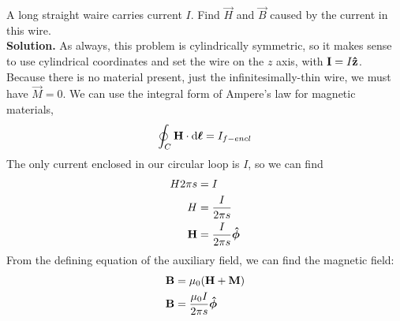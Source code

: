 \documentclass[a4paper]{article}
\begin{document}
\begin{eg}
	A long straight waire carries current $I$. Find $\vec{H}$ and
	$\vec{B}$ caused by the current in this wire.\\
	\textbf{Solution.}
	As always, this problem is cylindrically symmetric, so it makes sense
	to use cylindrical coordinates and set the wire on the $z$ axis, with
	$\boldsymbol{\mathbf{I}} = I\boldsymbol{\mathbf{\hat{z}}}$. Because there is no material present, just the
	infinitesimally-thin wire, we must have $\vec{M} = 0$.
	We can use the integral form of Ampere's law for
	magnetic materials,
	\[ \oint_C \boldsymbol{\mathbf{H}}\cdot\mathrm{d}\boldsymbol{\mathbf{\ell}} = I_{f-encl} \]
	The only current enclosed in our circular loop is $I$, so we can
	find
	\begin{align*}
		H2\pi s &= I\\
		H &= \frac{I}{2\pi s}\\
		\boldsymbol{\mathbf{H}} &= \frac{I}{2\pi s}\boldsymbol{\mathbf{\hat{\phi}}}
	\end{align*}
	From the defining equation of the auxiliary field, we can find the
	magnetic field:
	\begin{align*}
		\boldsymbol{\mathbf{B}} &= \mu_0(\boldsymbol{\mathbf{H}}+\boldsymbol{\mathbf{M}})\\
		\boldsymbol{\mathbf{B}} &= \frac{\mu_0 I}{2\pi s}\boldsymbol{\mathbf{\hat{\phi}}}
	\end{align*}
\end{eg}
\end{document}
